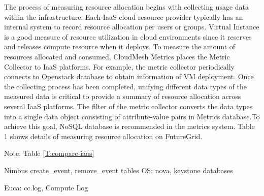 \documentclass{tex/sig-alternate}
\begin{document}
{The process of measuring resource allocation begins with collecting usage data within the infrastructure. Each IaaS cloud resource provider typically has an internal system to record resource allocation per users or groups. Virtual Instance is a good measure of resource utilization in cloud environments since it reserves and releases compute resource when it deploys. To measure the amount of resources allocated and consumed, CloudMesh Metrics places the Metric Collector to IaaS platforms. For example, the metric collector periodically connects to Openstack database to obtain information of VM deployment. Once the collecting process has been completed, unifying different data types of the measured data is critical to provide a summary of resource allocation across several IaaS platforms. The filter of the metric collector converts the data types into a single data object consisting of attribute-value pairs in Metrics database.To achieve this goal, NoSQL database is recommended in the metrics system.  Table 1 shows  details of measuring resource allocation on FutureGrid.

Note:
Table \ref{T:compare-iaas}

    Nimbus create\_event, remove\_event tables 
    OS: nova, keystone  databases 

    Euca: cc.log, Compute Log 


\newcommand{\YES}{\ding{51}}

\newcommand{\NO}{\ding{55}}


}
\end{document}

